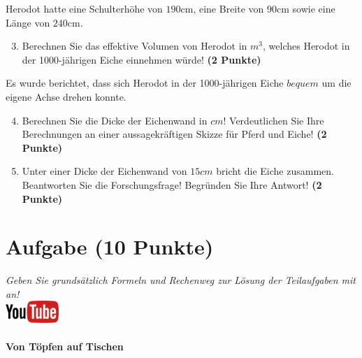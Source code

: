 \documentclass[a4paper, 9pt]{scrartcl}\usepackage[]{graphicx}\usepackage[]{xcolor}
\begin{document}
Herodot hatte eine Schulterh{\"o}he von $190$cm, eine Breite von
$90$cm sowie eine L{\"a}nge von  $240$cm.

\begin{enumerate}
  \setcounter{enumi}{2}
\item Berechnen Sie das effektive Volumen von Herodot in $m^3$, welches
  Herodot in der 1000-j{\"a}hrigen Eiche einnehmen w{\"u}rde! \textbf{(2 Punkte)}
\end{enumerate}

Es wurde berichtet, dass sich Herodot in der 1000-j{\"a}hrigen Eiche
$bequem$ um die eigene Achse drehen konnte.

\begin{enumerate}
  \setcounter{enumi}{3}
\item Berechnen Sie die Dicke der Eichenwand in $cm$! Verdeutlichen Sie Ihre
  Berechnungen an einer aussagekr{\"a}ftigen Skizze f{\"u}r Pferd und Eiche! \textbf{(2 Punkte)} 
\item Unter einer Dicke der Eichenwand von $15cm$ bricht
  die Eiche zusammen. Beantworten Sie die Forschungsfrage! Begr{\"u}nden Sie
  Ihre Antwort! \textbf{(2 Punkte)} 
\end{enumerate}
 
\clearpage

\section{Aufgabe \hfill (10 Punkte)}

\textit{Geben Sie grunds{\"a}tzlich Formeln und Rechenweg zur L{\"o}sung der
  Teilaufgaben mit an!} \\[1Ex]

\hfill\href{https://youtu.be/57B-yYoFSk0}{\includegraphics[width =
  2cm]{img/youtube}} %
\hspace{2Ex}

\paragraph{Von T{\"o}pfen auf Tischen}
\end{document}

